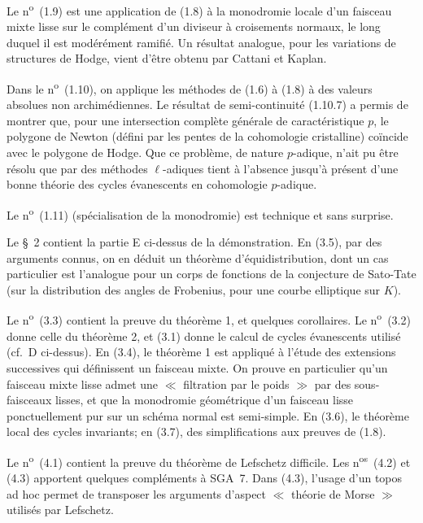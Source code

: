 \documentclass[12pt,a4paper]{article}
\theoremstyle{plain}
\theoremstyle{definition}
\theoremstyle{definition}
\theoremstyle{remark}
\begin{document}
Le n\textsuperscript{o}~(1.9) est une application de (1.8) \`a la monodromie locale d'un faisceau mixte lisse sur le compl\'ement d'un diviseur \`a croisements normaux, le long duquel il est mod\'er\'ement ramifi\'e. Un r\'esultat analogue, pour les variations de structures de Hodge, vient d'être obtenu par Cattani et Kaplan.

Dans le n\textsuperscript{o}~(1.10), on applique les m\'ethodes de (1.6) \`a (1.8) \`a des valeurs absolues non archim\'ediennes. Le r\'esultat de semi-continuit\'e (1.10.7) a permis de montrer que, pour une intersection compl\`ete g\'en\'erale de caract\'eristique $p$, le polygone de Newton (d\'efini par les pentes de la cohomologie cristalline) co\"incide avec le polygone de Hodge. Que ce probl\`eme, de nature $p$-adique, n'ait pu être r\'esolu que par des m\'ethodes $\ell$-adiques tient \`a l'absence jusqu'\`a pr\'esent d'une bonne th\'eorie des cycles \'evanescents en cohomologie $p$-adique.

Le n\textsuperscript{o}~(1.11) (sp\'ecialisation de la monodromie) est technique et sans surprise.

Le \S~2 contient la partie E ci-dessus de la d\'emonstration. En (3.5), par des arguments connus, on en d\'eduit un th\'eor\`eme d'\'equidistribution, dont un cas particulier est l'analogue pour un corps de fonctions de la conjecture de Sato-Tate (sur la distribution des angles de Frobenius, pour une courbe elliptique sur $K$).

Le n\textsuperscript{o}~(3.3) contient la preuve du th\'eor\`eme 1, et quelques corollaires. Le n\textsuperscript{o}~(3.2) donne celle du th\'eor\`eme 2, et (3.1) donne le calcul de cycles \'evanescents utilis\'e (cf.~D ci-dessus). En (3.4), le th\'eor\`eme 1 est appliqu\'e \`a l'\'etude des extensions successives qui d\'efinissent un faisceau mixte. On prouve en particulier qu'un faisceau mixte lisse admet une $\ll$ filtration par le poids $\gg$ par des sous-faisceaux lisses, et que la monodromie g\'eom\'etrique d'un faisceau lisse ponctuellement pur sur un sch\'ema normal est semi-simple. En (3.6), le th\'eor\`eme local des cycles invariants; en (3.7), des simplifications aux preuves de (1.8).

Le n\textsuperscript{o}~(4.1) contient la preuve du th\'eor\`eme de Lefschetz difficile. Les n\textsuperscript{os}~(4.2) et (4.3) apportent quelques compl\'ements \`a SGA~7. Dans (4.3), l'usage d'un topos ad hoc permet de transposer les arguments d'aspect $\ll$ th\'eorie de Morse $\gg$ utilis\'es par Lefschetz.
\end{document}
